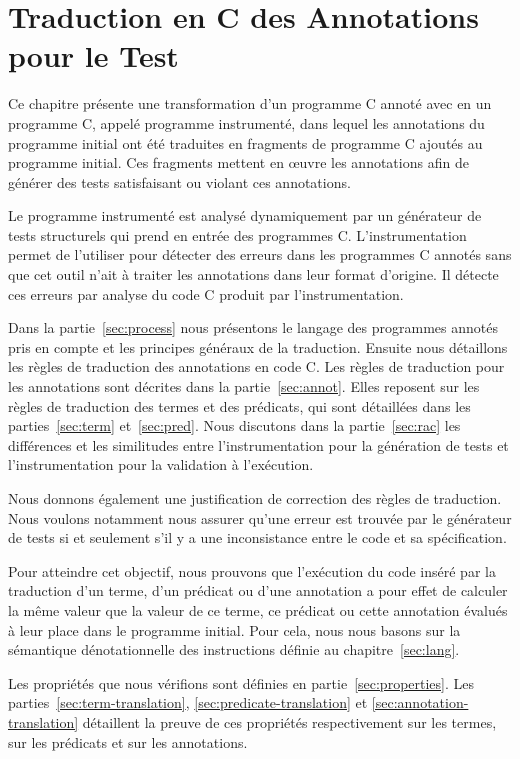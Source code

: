 
\chapter{Traduction en C des Annotations pour le Test}
\label{sec:traduction}

\chapterintro

Ce chapitre présente une transformation d'un programme C annoté avec \eacsl en
un programme C, appelé programme instrumenté, dans lequel les annotations
\eacsl du programme initial ont été traduites en fragments de programme C
ajoutés au programme initial.
Ces fragments mettent en \oe{}uvre les annotations \eacsl afin de générer des
tests satisfaisant ou violant ces annotations.

Le programme instrumenté est analysé dynamiquement par un générateur de tests
structurels qui prend en entrée des programmes C.
L'instrumentation permet de l'utiliser pour détecter des erreurs dans les
programmes C annotés sans que cet outil n'ait à traiter les annotations dans
leur format d'origine.
Il détecte ces erreurs par analyse du code C produit par l'instrumentation.

Dans la partie~\ref{sec:process} nous présentons le langage des programmes
annotés pris en compte et les principes généraux de la traduction.
Ensuite nous détaillons les règles de traduction des annotations \eacsl en code
C.
Les règles de traduction pour les annotations sont décrites dans la
partie~\ref{sec:annot}.
Elles reposent sur les règles de traduction des termes et des prédicats, qui
sont détaillées dans les parties~\ref{sec:term} et~\ref{sec:pred}.
Nous discutons dans la partie~\ref{sec:rac} les différences et les
similitudes entre l'instrumentation pour la génération de tests et
l'instrumentation pour la validation à l'exécution.

Nous donnons également une justification de correction des règles de
traduction.
Nous voulons notamment nous assurer qu'une erreur est trouvée par le
générateur de tests si et seulement s'il y a une inconsistance entre le code
et sa spécification.

Pour atteindre cet objectif, nous prouvons que l'exécution du code inséré par
la traduction d'un terme, d'un prédicat ou d'une annotation a pour effet de
calculer la même valeur que la valeur de ce terme, ce prédicat ou cette
annotation évalués à leur place dans le programme initial.
Pour cela, nous nous basons sur la sémantique dénotationnelle des instructions
définie au chapitre~\ref{sec:lang}.

Les propriétés que nous vérifions sont définies en partie~\ref{sec:properties}.
Les parties~\ref{sec:term-translation}, \ref{sec:predicate-translation} et
\ref{sec:annotation-translation} détaillent la preuve de ces propriétés
respectivement sur les termes, sur les prédicats et sur les annotations.


